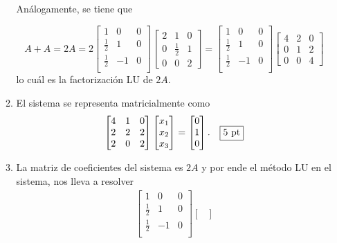 \documentclass[11pt]{article}
\begin{document}
\begin{enumerate}
\begin{enumerate}
An\'alogamente, se tiene que 

$$
A+A=2A=2
\begin{bmatrix}
1 & 0 & 0 \\
\frac{1}{2} & 1 & 0 \\
\frac{1}{2} & -1 & 0 \\
\end{bmatrix}
              \begin{bmatrix}
              2 & 1 			& 0		\\
              0 & \frac{1}{2}  	& 1 	\\
              0 & 0 			& 2
              \end{bmatrix}
=
\begin{bmatrix}
1 & 0 & 0 \\
\frac{1}{2} & 1 & 0 \\
\frac{1}{2} & -1 & 0 \\
\end{bmatrix}
              \begin{bmatrix}
              4 & 2 			& 0		\\
              0 & 1  			& 2 	\\
              0 & 0 			& 4
              \end{bmatrix}
$$
lo cu\'al es la factorizaci\'on LU de $2A$. \fbox{2 pt}
\item El sistema se representa matricialmente como
$$
\begin{bmatrix}
4 & 1 & 0\\
2 & 2 & 2\\
2 & 0 & 2 
\end{bmatrix}
\begin{bmatrix}
x_1\\x_2\\x_3
\end{bmatrix}
=
\begin{bmatrix}
0\\1\\0
\end{bmatrix}. \quad \fbox{5 pt}
$$
\item La matriz de coeficientes del sistema es $2A$ y por ende el m\'etodo LU en el sistema, nos lleva a resolver
$$
\begin{array}{r|}
\begin{bmatrix}
1 & 0 & 0 \\
\frac{1}{2} & 1 & 0 \\
\frac{1}{2} & -1 & 0 \\
\end{bmatrix}
\begin{bmatrix}

\end{bmatrix}
\end{array}$$
\end{enumerate}
\end{enumerate}
\end{document}
